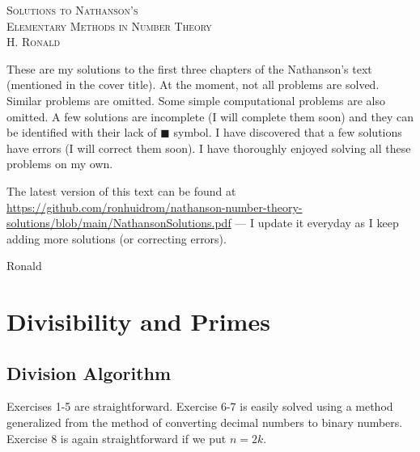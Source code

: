 \documentclass[11pt, leqno]{article}
\newcommand{\done}{\ensuremath{\blacksquare}}
\begin{document}
\setlength{\abovedisplayskip}{0pt}
\setlength{\belowdisplayskip}{0pt}
\setlength{\abovedisplayshortskip}{0pt}
\setlength{\belowdisplayshortskip}{0pt}

\thispagestyle{empty}

\pagebreak
\hspace{0pt}
\vfill
\begin{center}
  \Large
  \textsc{Solutions to Nathanson's \\
    Elementary Methods in Number Theory} \\
  \vspace{1em}
  \large
  \textsc{H. Ronald}
\end{center}
\vfill
\hspace{0pt}
\pagebreak

\clearpage
\thispagestyle{empty}


\pagebreak
\hspace{0pt}
\vfill
These are my solutions to the first three chapters of the Nathanson's text (mentioned in the cover title). At the moment, not all problems are solved. Similar problems are omitted. Some simple computational problems are also omitted. A few solutions are incomplete (I will complete them soon) and they can be identified with their lack of \done{} symbol. I have discovered that a few solutions have errors (I will correct them soon). I have thoroughly enjoyed solving all these problems on my own.

The latest version of this text can be found at \hyperref{https://github.com/ronhuidrom/nathanson-number-theory-solutions/blob/main/NathansonSolutions.pdf}{}{}{https://github.com/ronhuidrom/nathanson-number-theory-solutions/blob/main/NathansonSolutions.pdf} --- I update it everyday as I keep adding more solutions (or correcting errors).

\hfill Ronald
\vfill
\hspace{0pt}
\pagebreak
\clearpage

\tableofcontents
\clearpage

\normalsize
\section{Divisibility and Primes}

\subsection{Division Algorithm}

Exercises 1-5 are straightforward. Exercise 6-7 is easily solved using a method generalized from the method of converting decimal numbers to binary numbers. Exercise 8 is again straightforward if we put $n=2k$.
\end{document}
